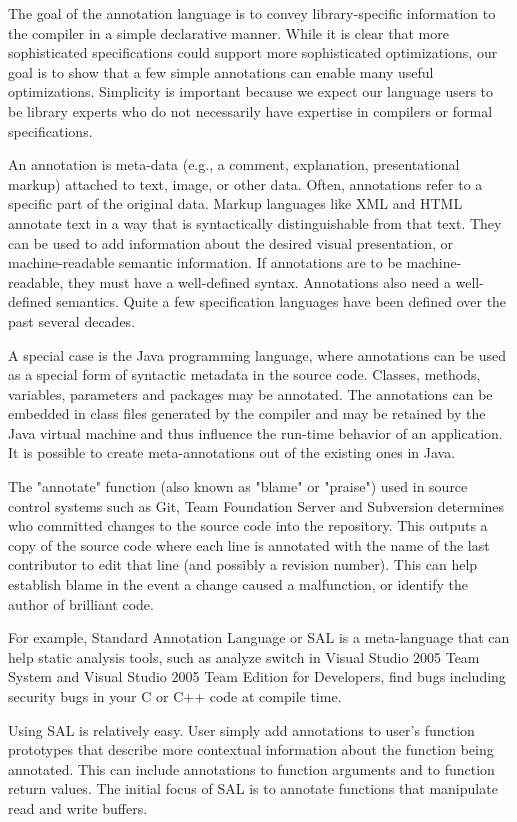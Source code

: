 The goal of the annotation language is to convey library-specific information to the compiler in a simple declarative manner. While it is clear that more sophisticated specifications could support more sophisticated optimizations, our goal is to show that a few simple annotations can enable many useful optimizations. Simplicity is important because we expect our language users to be library experts who do not necessarily have expertise in compilers or formal specifications.

An annotation is meta-data (e.g., a comment, explanation, presentational markup) attached to text, image, or other data. Often, annotations refer to a specific part of the original data. Markup languages like XML and HTML annotate text in a way that is syntactically distinguishable from that text. They can be used to add information about the desired visual presentation, or machine-readable semantic information. If annotations are to be machine-readable, they must have a well-defined syntax. Annotations also need a well-defined semantics. Quite a few specification languages have been defined over the past several decades. 

A special case is the Java programming language, where annotations can be used as a special form of syntactic metadata in the source code. Classes, methods, variables, parameters and packages may be annotated. The annotations can be embedded in class files generated by the compiler and may be retained by the Java virtual machine and thus influence the run-time behavior of an application. It is possible to create meta-annotations out of the existing ones in Java.

The "annotate" function (also known as "blame" or "praise") used in source control systems such as Git, Team Foundation Server and Subversion determines who committed changes to the source code into the repository. This outputs a copy of the source code where each line is annotated with the name of the last contributor to edit that line (and possibly a revision number). This can help establish blame in the event a change caused a malfunction, or identify the author of brilliant code.

For example, Standard Annotation Language or SAL \cite{ref_51_microsoft:sal} is a meta-language that can help static analysis tools, such as analyze switch in Visual Studio 2005 Team System and Visual Studio 2005 Team Edition for Developers, find bugs including security bugs in your C or C++ code at compile time.

Using SAL is relatively easy. User simply add annotations to user's function prototypes that describe more contextual information about the function being annotated. This can include annotations to function arguments and to function return values. The initial focus of SAL is to annotate functions that manipulate read and write buffers. 


